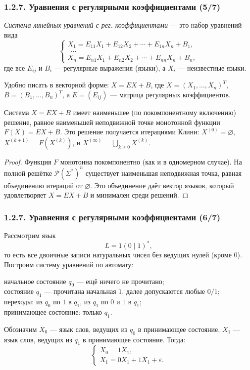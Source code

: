 \documentclass[mathserif,12pt,aspectratio=169]{beamer}
\renewcommand{\index}[1]{}
\def\odmkey#1#2{{\it\color{red} #1}\index{#2}}
\let\ge\geqslant
\begin{document}
\begin{frame}
\frametitle{1.2.7. Уравнения с регулярными коэффициентами (5/7)}
\odmkey{Система линейных уравнений с рег. коэффициентами}{Уравнение!система с регулярными коэффициентами}
--- это набор уравнений вида
\[
\begin{cases}
X_1 = E_{11}X_1 + E_{12}X_2 + \cdots + E_{1n}X_n + B_1,\\
\ \ \dots\\
X_n = E_{n1}X_1 + E_{n2}X_2 + \cdots + E_{nn}X_n + B_n,
\end{cases}
\]
где все $E_{ij}$ и $B_i$ --- регулярные выражения (языки), а $X_i$ --- неизвестные языки.


\begin{remark}
Удобно писать в векторной форме: $X=EX+B$, где
$X=(X_1,\dots,X_n)^T$, $B=(B_1,\dots,B_n)^T$,
а $E=(E_{ij})$ --- матрица регулярных коэффициентов.
\end{remark}

\begin{theorem}
Система $X=EX+B$ имеет наименьшее (по покомпонентному включению) решение,
равное наименьшей неподвижной точке монотонной функции $F(X)=EX+B$.
Это решение получается итерациями Клини:
$X^{(0)}=\varnothing$, $X^{(k+1)}=F(X^{(k)})$, и
$X^{(\infty)}=\bigcup_{k\ge 0}X^{(k)}$.
\end{theorem}

\begin{proof}
Функция $F$ монотонна покомпонентно (как и в одномерном случае).
На полной решётке $\mathcal{P}(\Sigma^*)^n$ существует наименьшая неподвижная точка,
равная объединению итераций от $\varnothing$.
Это объединение даёт вектор языков, который удовлетворяет $X=EX+B$ и минимален среди решений.
\end{proof}
\end{frame}

\begin{frame}
\frametitle{1.2.7. Уравнения с регулярными коэффициентами (6/7)}
\begin{example}
Рассмотрим язык
\[
L=1(0\mid 1)^*,
\]
то есть все двоичные записи натуральных чисел без ведущих нулей (кроме $0$).
Построим систему уравнений по автомату:

\smallskip

начальное состояние $q_0$ --- ещё ничего не прочитано;\\
состояние $q_1$ --- прочитана начальная $1$, далее допускаются любые $0/1$;\\
переходы: из $q_0$ по $1$ в $q_1$, из $q_1$ по $0$ и $1$ в $q_1$;\\
принимающее состояние: только $q_1$.


Обозначим $X_0$ --- язык слов, ведущих из $q_0$ в принимающее состояние,
$X_1$ --- язык слов, ведущих из $q_1$ в принимающее состояние.
Тогда:
\[
\begin{cases}
X_0 = 1X_1,\\
X_1 = 0X_1 + 1X_1 + \varepsilon.
\end{cases}
\]
\end{example}
\end{frame}
\end{document}
